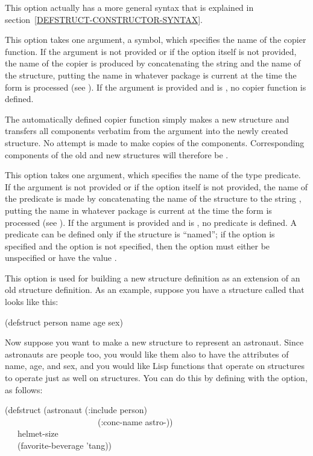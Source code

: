 \begin{flushdesc}
This option actually has a more general syntax that is explained
in section~\ref{DEFSTRUCT-CONSTRUCTOR-SYNTAX}.

\item[\cd{:copier}]
This option takes one argument, a symbol,
which specifies the name of the copier
function.  If the argument is not provided or if the option itself is not
provided, the name of the copier is produced by concatenating the
string  and the name of the structure, putting the name
in whatever package is current at the time the 
form is processed (see ).
If the argument is provided and is {\false}, no copier function is defined.

The automatically defined copier function simply makes a new structure
and transfers all components verbatim from the argument into the
newly created structure.  No attempt is made to make copies
of the components.  Corresponding components of the old and
new structures will therefore be .

\item[\cd{:predicate}]
This option takes one argument, which specifies the name of the type predicate.
If the argument is not provided or if the option itself is not
provided, the name of the predicate is made by concatenating the
name of the structure to the string , putting the name
in whatever package is current at the time the 
form is processed (see ).
If the argument is
provided and is {\false}, no predicate is defined.  A predicate can be defined
only if the structure is ``named'';
if the  option is specified
and the  option is
not specified, then the  option must either be unspecified
or have the value {\false}.

\item[\cd{:include}]
This option is used for building a new structure definition as
an extension of an old structure definition.  As an example,
suppose you have a structure called  that looks like this:
\begin{lisp}
(defstruct person name age sex)
\end{lisp}
Now suppose you want to make a new structure to represent an astronaut.
Since astronauts are people too, you would like them also to have the
attributes of name, age, and sex, and you would like Lisp functions
that operate on  structures to operate just as well on
 structures.  You can do this by defining 
with the  option, as follows:
\begin{lisp}
(defstruct (astronaut (:include person) \\
~~~~~~~~~~~~~~~~~~~~~~(:conc-name astro-)) \\
~~~helmet-size \\
~~~(favorite-beverage 'tang))
\end{lisp}


\end{flushdesc}
